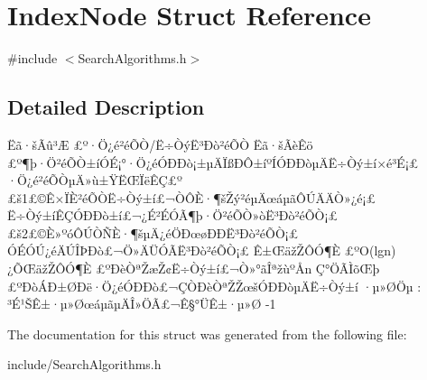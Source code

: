 \hypertarget{struct_index_node}{
\section{\-Index\-Node \-Struct \-Reference}
\label{struct_index_node}
}


{\ttfamily \#include $<$\-Search\-Algorithms.\-h$>$}



\subsection{\-Detailed \-Description}
Ëã·šÃû³Æ £º·Ö¿é²éÕÒ/Ë÷ÒýË³Ðò²éÕÒ Ëã·šÃèÊö £º¶þ·Ö²éÕÒ±íÓÉ¡°·Ö¿éÓÐÐò¡±µÄÏßÐÔ±íºÍÓÐÐòµÄË÷Òý±í×é³É¡£ ·Ö¿é²éÕÒµÄ»ù±ŸËŒÏëÊÇ£º £š1£©Ê×ÏÈ²éÕÒË÷Òý±í£¬ÒÔÈ·¶šŽý²éµÄœáµãÔÚÄÄÒ»¿é¡£ Ë÷Òý±íÊÇÓÐÐò±í£¬¿É²ÉÓÃ¶þ·Ö²éÕÒ»òË³Ðò²éÕÒ¡£ £š2£©È»ºóÔÚÒÑÈ·¶šµÄ¿éÖÐœøÐÐË³Ðò²éÕÒ¡£ ÓÉÓÚ¿éÄÚÎÞÐò£¬Ö»ÄÜÓÃË³Ðò²éÕÒ¡£ Ê±ŒäžŽÔÓ¶È £º\-O(lgn) ¿ÕŒäžŽÔÓ¶È £ºÐèÒªŽæŽ¢Ë÷Òý±í£¬Ò»°ãÎªžùºÅn Ç°ÖÃÌõŒþ £ºÐòÁÐ±ØÐë·Ö¿éÓÐÐò£¬ÇÒÐèÒªŽŽœšÓÐÐòµÄË÷Òý±í ·µ»ØÖµ \-: ³É¹ŠÊ±·µ»ØœáµãµÄÎ»ÖÃ£¬Ê§°ÜÊ±·µ»Ø -\/1 

\-The documentation for this struct was generated from the following file\-:\begin{DoxyCompactItemize}
\item 
include/\-Search\-Algorithms.\-h\end{DoxyCompactItemize}

